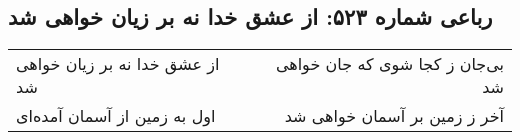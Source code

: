 \begin{center}
\section*{رباعی شماره ۵۲۳: از عشق خدا نه بر زیان خواهی شد}
\label{sec:0523}
\begin{longtable}{l p{0.5cm} r}
از عشق خدا نه بر زیان خواهی شد
&&
بی‌جان ز کجا شوی که جان خواهی شد
\\
اول به زمین از آسمان آمده‌ای
&&
آخر ز زمین بر آسمان خواهی شد
\\
\end{longtable}
\end{center}
